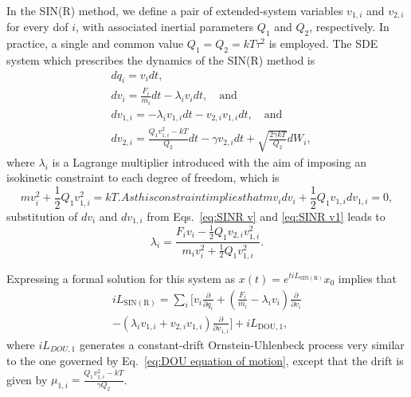 \documentclass[
    journal=jctcce,
    layout=twocolumn
]{achemso}
\newcommand{\diff}[2]{\frac{\partial #2}{\partial #1}} %
\newcommand{\dof}{i}   %
\newcommand{\Liu}{i\!L}
\begin{document}
In the SIN(R) method, we define a pair of extended-system variables $v_{1,\dof}$ and $v_{2,\dof}$ for every dof $\dof$, with associated inertial parameters $Q_1$ and $Q_2$, respectively.
In practice, a single and common value $Q_1 = Q_2 = kT\tau^2$ is employed.
The SDE system which prescribes the dynamics of the SIN(R) method is
\begin{subequations}
	\label{eq:SINR equations of motion}
	\begin{align}
	& dq_\dof = v_\dof dt, \label{eq:SINR q} \\
	& dv_\dof = \frac{F_\dof}{m_\dof} dt - \lambda_\dof v_\dof dt, \quad \mathrm{and} \label{eq:SINR v}  \\
	& dv_{1,\dof} = -\lambda_\dof v_{1,\dof} dt - v_{2,\dof} v_{1,\dof} dt, \quad \mathrm{and} \label{eq:SINR v1}  \\
	& dv_{2,\dof} = \tfrac{Q_1 v_{1,\dof}^2 - kT}{Q_2}dt - \gamma v_{2,\dof} dt + \sqrt{\tfrac{2 \gamma kT}{Q_2}} dW_\dof, \label{eq:SINR v2}
	\end{align}
\end{subequations}
where $\lambda_\dof$ is a Lagrange multiplier introduced with the aim of imposing an isokinetic constraint to each degree of freedom, which is \cite{Leimkuhler_2013, Margul_2016}
\begin{subequations}
\label{eq:isokinetic constraint}
\begin{equation}
m v_\dof^2 + \frac{1}{2} Q_1 v_{1,\dof}^2 = kT.
\end{equation}

As this constraint implies that
\begin{equation}
\label{eq:isokinetic constraint derivative}
m v_\dof dv_\dof + \frac{1}{2} Q_1 v_{1,\dof}dv_{1,\dof} = 0,
\end{equation}
\end{subequations}
substitution of $dv_\dof$ and $dv_{1,\dof}$ from Eqs.~\eqref{eq:SINR v} and \eqref{eq:SINR v1} leads to
\begin{equation}
\lambda_\dof = \frac{F_\dof v_\dof - \frac{1}{2} Q_1 v_{2,\dof} v_{1,\dof}^2}{m_\dof v_\dof^2 + \frac{1}{2} Q_1 v_{1,\dof}^2}.
\end{equation}

Expressing a formal solution for this system as $x(t) = e^{t \Liu_\mathrm{SIN(R)}} x_0$ implies that
\begin{multline}
\label{eq:SINR Liouville operator}
\Liu_\mathrm{SIN(R)} = \sum_\dof \bigg[ v_\dof\diff{q_\dof}{} + \left(\frac{F_\dof}{m_\dof} - \lambda_\dof v_\dof\right)\diff{v_\dof}{} \\
- \left( \lambda_\dof v_{1,\dof} + v_{2,\dof} v_{1,\dof} \right) \diff{v_{1,\dof}}{} \bigg] + \Liu_\mathrm{DOU,1},
\end{multline}
where $\Liu_{DOU,1}$ generates a constant-drift Ornstein-Uhlenbeck process very similar to the one governed by Eq.~\eqref{eq:DOU equation of motion}, except that the drift is given by $\mu_{1,\dof} = \frac{Q_1 v_{1,\dof}^2 - kT}{\gamma Q_2}$.
\end{document}
